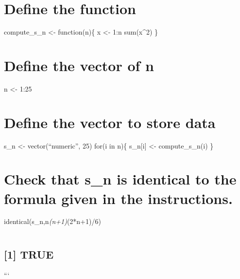 \documentclass[
]{article}
\begin{document}
\hypertarget{define-the-function-1}{%
\section{Define the function}\label{define-the-function-1}}

compute\_s\_n \textless- function(n)\{ x \textless- 1:n sum(x\^{}2) \}

\hypertarget{define-the-vector-of-n-1}{%
\section{Define the vector of n}\label{define-the-vector-of-n-1}}

n \textless- 1:25

\hypertarget{define-the-vector-to-store-data-1}{%
\section{Define the vector to store
data}\label{define-the-vector-to-store-data-1}}

s\_n \textless- vector(``numeric'', 25) for(i in n)\{ s\_n{[}i{]}
\textless- compute\_s\_n(i) \}

\hypertarget{check-that-s_n-is-identical-to-the-formula-given-in-the-instructions.}{%
\section{Check that s\_n is identical to the formula given in the
instructions.}\label{check-that-s_n-is-identical-to-the-formula-given-in-the-instructions.}}

identical(s\_n,n\emph{(n+1)}(2*n+1)/6)

\begin{verbatim}
\end{verbatim}

\hypertarget{true}{%
\subsection{{[}1{]} TRUE}\label{true}}

```
\end{document}

